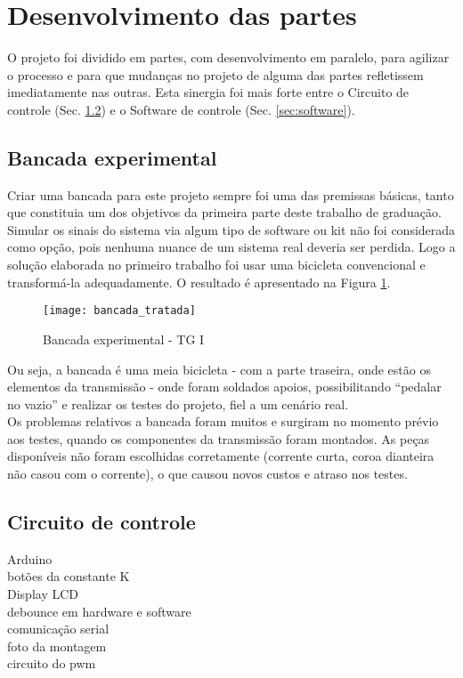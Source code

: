 \documentclass[a4paper,11pt]{article}
\begin{document}
\pagebreak
%
\section{Desenvolvimento das partes}
\label{sec:partes}
O projeto foi dividido em partes, com desenvolvimento em paralelo, para agilizar o processo e para que mudanças no projeto de alguma das partes refletissem imediatamente nas outras. Esta sinergia foi mais forte entre o Circuito de controle (Sec. \ref{sec:arduino}) e o Software de controle (Sec. \ref{sec:software}).

\subsection{Bancada experimental}
\label{sec:bancada}
Criar uma bancada para este projeto sempre foi uma das premissas básicas, tanto que constituia um dos objetivos da primeira parte deste trabalho de graduação. Simular os sinais do sistema via algum tipo de software ou kit não foi considerada como opção, pois nenhuma nuance de um sistema real deveria ser perdida. Logo a solução elaborada no primeiro trabalho foi usar uma bicicleta convencional e transformá-la adequadamente. O resultado é apresentado na Figura \ref{fig:bancada}.
\begin{figure}[ht]
 \begin{center}
  \texttt{[image: bancada\_tratada]}
 \end{center}
 \caption{Bancada experimental - TG I}
 \label{fig:bancada}
\end{figure}
Ou seja, a bancada é uma meia bicicleta - com a parte traseira, onde estão os elementos da transmissão - onde foram soldados apoios, possibilitando ``pedalar no vazio'' e realizar os testes do projeto, fiel a um cenário real. \\
Os problemas relativos a bancada foram muitos e surgiram no momento prévio aos testes, quando os componentes da transmissão foram montados. As peças disponíveis não foram escolhidas corretamente (corrente curta, coroa dianteira não casou com o corrente), o que causou novos custos e atraso nos testes.

%
\subsection{Circuito de controle}
\label{sec:arduino}
Arduino\\
botões da constante K \\
Display LCD \\
debounce em hardware e software \\
comunicação serial \\
foto da montagem \\
circuito do pwm \\
\end{document}
